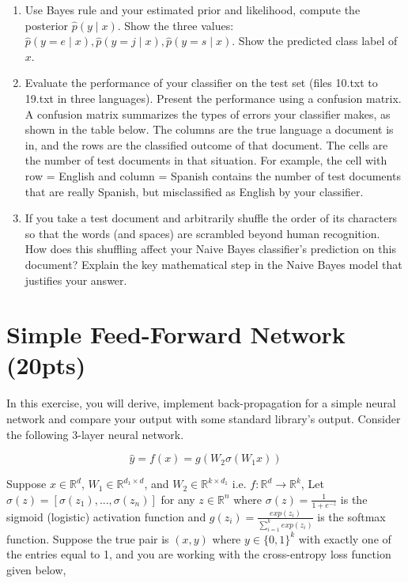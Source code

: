 \documentclass[letter]{article}
\theoremstyle{definition}
\begin{document}
\begin{enumerate}
\item
Use Bayes rule and your estimated prior and likelihood, compute the posterior $\hat p(y \mid x)$.
Show the three values: $\hat p(y=e \mid x), \hat p(y=j \mid x), \hat p(y=s \mid x)$.
Show the predicted class label of $x$.


\item
Evaluate the performance of your classifier on the test set (files 10.txt to 19.txt in three languages).
Present the performance using a confusion matrix. A confusion matrix summarizes the types of errors your classifier makes, as shown in the table below.   The columns are the true language a document is in, and the rows are the classified outcome of that document.  The cells are the number of test documents in that situation.  For example, the cell with row = English and column = Spanish contains the number of test documents that are really Spanish, but misclassified as English by your classifier.

\item If you take a test document and arbitrarily shuffle the order of its characters so that the words (and spaces) are scrambled beyond human recognition.  How does this shuffling affect your Naive Bayes classifier's prediction on this document?  Explain the key mathematical step in the Naive Bayes model that justifies your answer.

\end{enumerate}

\section{Simple Feed-Forward Network (20pts)}
In this exercise, you will derive, implement back-propagation for a simple neural network and compare your output with some standard library’s output. Consider the following 3-layer neural network.

\[
\hat{y} = f(x) = g(W_2\sigma(W_1x))
\]

Suppose $x \in \mathbb{R}^d$, $W_1 \in \mathbb{R}^{d_1 \times d}$, and $W_2 \in \mathbb{R}^{k \times d_1}$ i.e. $f: \mathbb{R}^d \rightarrow \mathbb{R}^k$, Let $\sigma(z) = [\sigma(z_1), ..., \sigma(z_n)]$ for any $z \in \mathbb{R}^n$ where $\sigma(z) = \frac{1}{1 + e^{-z}}$ is the sigmoid (logistic) activation function and $g(z_i) = \frac{exp(z_i)}{\sum_{i=1}^k exp(z_i)}$ is the softmax function. Suppose the true pair is $(x, y)$ where $y \in \{0, 1\}^k$ with exactly one of the entries equal to 1, and you are working with the cross-entropy loss function given below,
\end{document}
